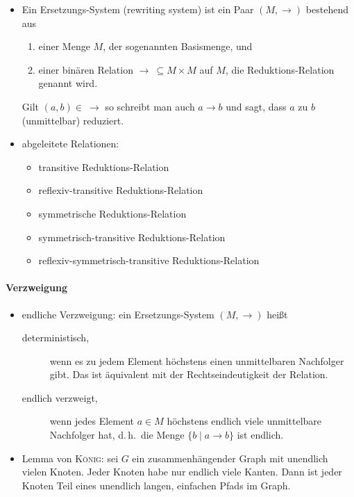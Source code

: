 \documentclass[
  a4paper,
  11pt,
]{scrartcl}
\begin{document}
\begin{itemize}
  \item Ein Ersetzungs-System (rewriting system) ist ein Paar $(M, \rightarrow)$
    bestehend aus
    \begin{enumerate}
      \item einer Menge $M$, der sogenannten Basismenge, und
      \item einer binären Relation $\rightarrow \ \subseteq M \times M$ auf $M$,
        die Reduktions-Relation genannt wird.
    \end{enumerate}
    Gilt $(a, b) \in \ \rightarrow$ so schreibt man auch $a \rightarrow b$ und
    sagt, dass $a$ zu $b$ (unmittelbar) reduziert.

  \item abgeleitete Relationen:
    \begin{itemize}
      \item transitive Reduktions-Relation
      \item reflexiv-transitive Reduktions-Relation
      \item symmetrische Reduktions-Relation
      \item symmetrisch-transitive Reduktions-Relation
      \item reflexiv-symmetrisch-transitive Reduktions-Relation
    \end{itemize}
\end{itemize}

\paragraph{Verzweigung}
\label{par:verzweigung}

\begin{itemize}
  \item endliche Verzweigung: ein Ersetzungs-System $(M, \rightarrow)$ heißt
    \begin{description}
      \item[deterministisch,] wenn es zu jedem Element höchstens einen
        unmittelbaren Nachfolger gibt. Das ist äquivalent mit der
        Rechtseindeutigkeit der Relation.
      \item[endlich verzweigt,] wenn jedes Element $a \in M$ höchstens endlich
        viele unmittelbare Nachfolger hat, d.\,h.\ die Menge $\{b \mid a
        \rightarrow b\}$ ist endlich.
    \end{description}

  \item Lemma von \textsc{König}: sei $G$ ein zusammenhängender Graph mit
    unendlich vielen Knoten. Jeder Knoten habe nur endlich viele Kanten. Dann
    ist jeder Knoten Teil eines unendlich langen, einfachen Pfads im Graph.
\end{itemize}
\end{document}

